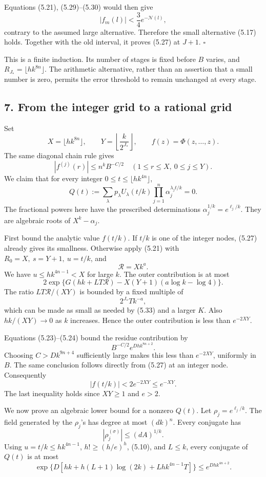 \documentclass[
  11pt,
  a4paper,
]{article}
\begin{document}
Equations (5.21), (5.29)--(5.30) would then give \[
|f_m(l)|<\frac34 e^{-\mathcal N(l)},
\] contrary to the assumed large alternative. Therefore the small
alternative (5.17) holds. Together with the old interval, it proves
(5.27) at \(J+1\). \(\square\)

This is a finite induction. Its number of stages is fixed before \(B\)
varies, and \(R_{J_*}=\lfloor hk^{8n}\rfloor\). The arithmetic
alternative, rather than an assertion that a small number is zero,
permits the error threshold to remain unchanged at every stage.

\subsection{7. From the integer grid to a rational
grid}\label{from-the-integer-grid-to-a-rational-grid}

Set \[
X=\lfloor hk^{8n}\rfloor,\qquad
Y=\left\lfloor\frac{k}{2^{J_*}}\right\rfloor,\qquad
f(z)=\Phi(z,\ldots,z).
\] The same diagonal chain rule gives \[
|f^{(j)}(r)|\le n^kB^{-C/2}
\quad(1\le r\le X,\ 0\le j\le Y). \tag{5.34}
\] We claim that for every integer \(0\le t\le\lfloor hk^{4n}\rfloor\),
\[
Q(t):=\sum_\lambda p_\lambda
U_\lambda(t/k)
\prod_{j=1}^n\alpha_j^{\lambda_jt/k}=0. \tag{5.35}
\] The fractional powers here have the prescribed determinations
\(\alpha_j^{1/k}=e^{\ell_j/k}\). They are algebraic roots of
\(X^k-\alpha_j\).

First bound the analytic value \(f(t/k)\). If \(t/k\) is one of the
integer nodes, (5.27) already gives its smallness. Otherwise apply
(5.21) with \(R_0=X,\ s=Y+1,\ u=t/k\), and \[
\mathcal R=Xk^a.
\] We have \(u\le hk^{4n-1}<X\) for large \(k\). The outer contribution
is at most \[
2\exp\{G(hk+LT\mathcal R)-X(Y+1)(a\log k-\log4)\}.
\] The ratio \(LT\mathcal R/(XY)\) is bounded by a fixed multiple of \[
2^{J_*}Tk^{-a},
\] which can be made as small as needed by (5.33) and a larger \(K\).
Also \(hk/(XY)\to0\) as \(k\) increases. Hence the outer contribution is
less than \(e^{-2XY}\).

Equations (5.23)--(5.24) bound the residue contribution by \[
B^{-C/2}e^{Dhk^{8n+2}}.
\] Choosing \(C>Dk^{9n+4}\) sufficiently large makes this less than
\(e^{-2XY}\), uniformly in \(B\). The same conclusion follows directly
from (5.27) at an integer node. Consequently \[
|f(t/k)|<2e^{-2XY}\le e^{-XY}. \tag{5.36}
\] The last inequality holds since \(XY\ge1\) and \(e>2\).

We now prove an algebraic lower bound for a nonzero \(Q(t)\). Let
\(\rho_j=e^{\ell_j/k}\). The field generated by the \(\rho_j\)'s has
degree at most \((dk)^n\). Every conjugate has \[
|\rho_j^{(\sigma)}|\le(dA)^{1/k}.
\] Using \(u=t/k\le hk^{4n-1}\), \(h!\ge(h/e)^h\), (5.10), and
\(L\le k\), every conjugate of \(Q(t)\) is at most \[
\exp\{D[hk+h(L+1)\log(2k)+Lhk^{4n-1}T]\}
\le e^{Dhk^{4n+2}}. \tag{5.37}
\]
\end{document}
